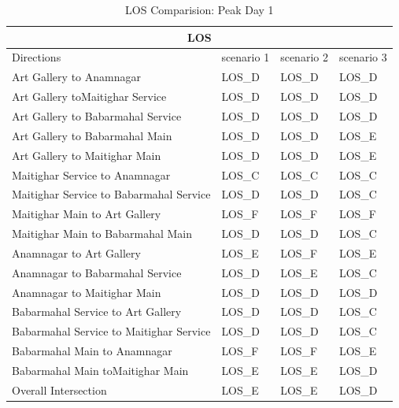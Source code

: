\begin{table}[h!]
    \centering
    \caption{LOS Comparision: Peak Day 1}
    \begin{tabular}{|l|l|l|l|}
        \hline
        \multicolumn{4}{|c|}{\textbf{LOS}} \\
        \hline
        Directions &	scenario 1 &	scenario 2 &	scenario 3 \\
        \hline
        Art Gallery to  Anamnagar	            &LOS\_D	&LOS\_D	&LOS\_D \\
        \hline
        Art Gallery toMaitighar Service	            &LOS\_D	&LOS\_D	&LOS\_D \\
        \hline
        Art Gallery to Babarmahal Service	            &LOS\_D	&LOS\_D	&LOS\_D \\
        \hline
        Art Gallery to Babarmahal Main	            &LOS\_D	&LOS\_D	&LOS\_E \\
        \hline
        Art Gallery to  Maitighar Main	            &LOS\_D	&LOS\_D	&LOS\_E \\
        \hline
        Maitighar Service to  Anamnagar	            &LOS\_C	&LOS\_C	&LOS\_C \\
        \hline
        Maitighar Service to Babarmahal Service	            &LOS\_D	&LOS\_D	&LOS\_C \\
        \hline
        Maitighar Main to  Art Gallery	            &LOS\_F	&LOS\_F	&LOS\_F \\
        \hline
        Maitighar Main to Babarmahal Main	            &LOS\_D	&LOS\_D	&LOS\_C \\
        \hline
        Anamnagar to Art Gallery	            &LOS\_E	&LOS\_F	&LOS\_E \\
        \hline
        Anamnagar to  Babarmahal Service	            &LOS\_D	&LOS\_E	&LOS\_C \\
        \hline
        Anamnagar to Maitighar Main	            &LOS\_D	&LOS\_D	&LOS\_D \\
        \hline
        Babarmahal Service to  Art Gallery	            &LOS\_D	&LOS\_D	&LOS\_C \\
        \hline
        Babarmahal Service  to Maitighar Service	&LOS\_D	&LOS\_D	&LOS\_C \\
        \hline
        Babarmahal Main to  Anamnagar	            &LOS\_F	&LOS\_F	&LOS\_E \\
        \hline
        Babarmahal Main toMaitighar Main	            &LOS\_E	&LOS\_E	&LOS\_D \\
        \hline
        Overall Intersection	            &LOS\_E	&LOS\_E	&LOS\_D \\
        \hline

    \end{tabular}
    
\end{table}

